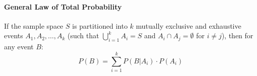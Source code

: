 \paragraph{General Law of Total Probability}
If the sample space $S$ is partitioned into $k$ mutually exclusive and exhaustive events $A_1, A_2, \dots, A_k$ (such that $\bigcup_{i=1}^{k} A_i = S$ and $A_i \cap A_j = \emptyset$ for $i \neq j$), then for any event $B$:
\[
    P(B) = \sum_{i=1}^{k} P(B|A_i) \cdot P(A_i)
\]